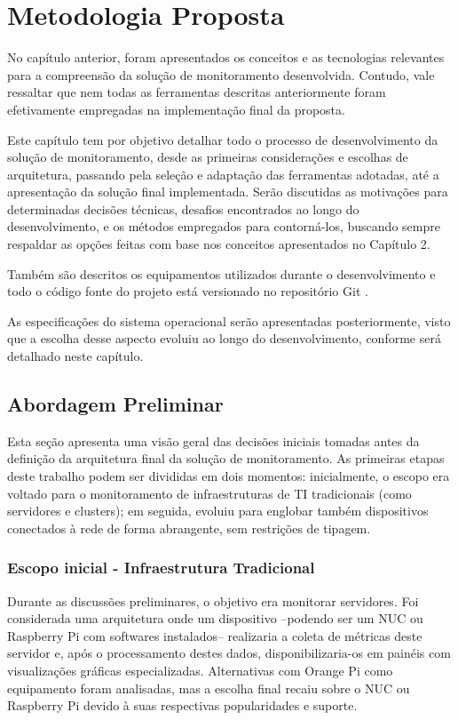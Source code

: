 \chapter{Metodologia Proposta}
\label{chap3}

No capítulo anterior, foram apresentados os conceitos e as tecnologias relevantes para a compreensão da solução de monitoramento desenvolvida. Contudo, vale ressaltar que nem todas as ferramentas descritas anteriormente foram efetivamente empregadas na implementação final da proposta.

Este capítulo tem por objetivo detalhar todo o processo de desenvolvimento da solução de monitoramento, desde as primeiras considerações e escolhas de arquitetura, passando pela seleção e adaptação das ferramentas adotadas, até a apresentação da solução final implementada. Serão discutidas as motivações para determinadas decisões técnicas, desafios encontrados ao longo do desenvolvimento, e os métodos empregados para contorná-los, buscando sempre respaldar as opções feitas com base nos conceitos apresentados no Capítulo 2. {\color{red}
Também são descritos os equipamentos utilizados durante o desenvolvimento e todo o código fonte do projeto está versionado no repositório Git \citep{githubrepotcc2025}.

As especificações do sistema operacional serão apresentadas posteriormente, visto que a escolha desse aspecto evoluiu ao longo do desenvolvimento, conforme será detalhado neste capítulo.
}
\section{Abordagem Preliminar}
\label{section:AbordagemPreliminar}

Esta seção apresenta uma visão geral das decisões iniciais tomadas antes da definição da arquitetura final da solução de monitoramento. As primeiras etapas deste trabalho podem ser divididas em dois momentos: inicialmente, o escopo era voltado para o monitoramento de infraestruturas de TI tradicionais (como servidores e clusters); em seguida, evoluiu para englobar também dispositivos conectados à rede de forma abrangente, sem restrições de tipagem.

\subsection{Escopo inicial - Infraestrutura Tradicional}
\label{subsection:EscopoInicial}

Durante as discussões preliminares, o objetivo era monitorar servidores. Foi considerada uma arquitetura onde um dispositivo --podendo ser um NUC ou Raspberry Pi com softwares instalados-- realizaria a coleta de métricas deste servidor e, após o processamento destes dados, disponibilizaria-os em painéis com visualizações gráficas especializadas. Alternativas com Orange Pi como equipamento foram analisadas, mas a escolha final recaiu sobre o NUC ou Raspberry Pi devido à suas respectivas popularidades e suporte.

